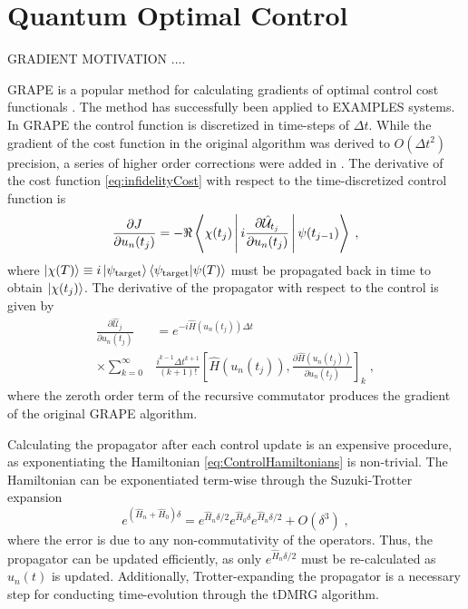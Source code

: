 \section{Quantum Optimal Control}

GRADIENT MOTIVATION ....

GRAPE is a popular method for calculating gradients of optimal control cost functionals \cite{khaneja2005optimal}. The method has successfully been applied to EXAMPLES systems. In GRAPE the control function is discretized in time-steps of  $\Delta t$. While the gradient of the cost function in the original algorithm was derived to $O(\Delta t ^2)$ precision, a series of higher order corrections were added in \cite{de2011second}. The derivative of the cost function \eqref{eq:infidelityCost} with respect to the time-discretized control function is
\begin{equation}
	\frac{\partial J}{\partial u_n (t_j)}  = - \Re \Braket{\chi (t_j) | i  \frac{\partial \hat{\mathcal{U}}_{t_j}}{\partial u_n (t_j)} | \psi (t_{j-1})} \; , \label{eq:CostDeriv}
\end{equation}
where $\ket{\chi (T)} \equiv i \ket{\psi_{\mathrm{target}}} \braket{\psi_{\mathrm{target}} | \psi (T)}$ must be propagated back in time to obtain $\ket{\chi (t_j)}$.
The derivative of the propagator with respect to the control is given by
\begin{align}
	\frac{\partial \hat{\mathcal{U}}_{j}}{\partial u_n (t_j)} &= e^{-i \hat{H} (u_n (t_j)) \Delta t} \nonumber \\ 
	 \times \sum_{k = 0}^{\infty } &  \frac{i^{k-1} \Delta t^{k+1}}{(k+1)!} \left[ \hat{H} (u_n (t_j)) , \frac{\partial \hat{H} (u_n (t_j))}{\partial u_n (t_j)}  \right]_k \; , \label{eq:PropDeriv}
\end{align}
where the zeroth order term of the recursive commutator produces the gradient of the original GRAPE algorithm.

Calculating the propagator after each control update is an expensive procedure, as exponentiating the Hamiltonian \eqref{eq:ControlHamiltonians} is non-trivial. The Hamiltonian can be exponentiated term-wise through the Suzuki-Trotter expansion
\begin{equation}
		e ^{( \hat{H}_n + \hat{H}_0  ) \delta } = e^{  \hat{H}_n \delta /2  } e^{ \hat{H}_0 \delta } e^{ \hat{H}_n \delta /2 } + O(\delta^3) \; , \label{eq:SuzukiTrotter}
\end{equation}
where the error is due to any non-commutativity of the operators.
Thus, the propagator can be updated efficiently, as only $e^{ \hat{H}_n \delta /2 }$ must be re-calculated as $u_n (t)$ is updated. Additionally, Trotter-expanding the propagator is a necessary step for conducting time-evolution through the tDMRG algorithm. 

